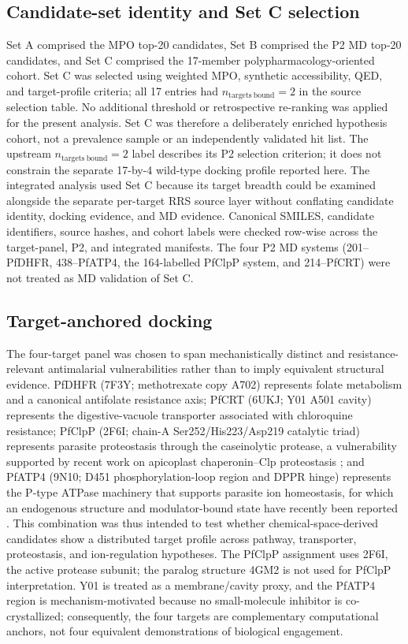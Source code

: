 \documentclass[journal=jcisd8,manuscript=article]{achemso}
\begin{document}
\subsection{Candidate-set identity and Set C selection}
Set A comprised the MPO top-20 candidates, Set B comprised the P2 MD top-20 candidates, and Set C comprised the 17-member polypharmacology-oriented cohort. Set C was selected using weighted MPO, synthetic accessibility, QED, and target-profile criteria; all 17 entries had $n_{\mathrm{targets\ bound}}=2$ in the source selection table. No additional threshold or retrospective re-ranking was applied for the present analysis. Set C was therefore a deliberately enriched hypothesis cohort, not a prevalence sample or an independently validated hit list. The upstream $n_{\mathrm{targets\ bound}}=2$ label describes its P2 selection criterion; it does not constrain the separate 17-by-4 wild-type docking profile reported here. The integrated analysis used Set C because its target breadth could be examined alongside the separate per-target RRS source layer without conflating candidate identity, docking evidence, and MD evidence. Canonical SMILES, candidate identifiers, source hashes, and cohort labels were checked row-wise across the target-panel, P2, and integrated manifests. The four P2 MD systems (201--PfDHFR, 438--PfATP4, the 164-labelled PfClpP system, and 214--PfCRT) were not treated as MD validation of Set C.

\subsection{Target-anchored docking}
The four-target panel was chosen to span mechanistically distinct and resistance-relevant antimalarial vulnerabilities rather than to imply equivalent structural evidence. PfDHFR (7F3Y; methotrexate copy A702) represents folate metabolism and a canonical antifolate resistance axis; PfCRT (6UKJ; Y01 A501 cavity) represents the digestive-vacuole transporter associated with chloroquine resistance; PfClpP (2F6I; chain-A Ser252/His223/Asp219 catalytic triad) represents parasite proteostasis through the caseinolytic protease, a vulnerability supported by recent work on apicoplast chaperonin--Clp proteostasis \cite{Tissawak2025}; and PfATP4 (9N10; D451 phosphorylation-loop region and DPPR hinge) represents the P-type ATPase machinery that supports parasite ion homeostasis, for which an endogenous structure and modulator-bound state have recently been reported \cite{Haile2025}. This combination was thus intended to test whether chemical-space-derived candidates show a distributed target profile across pathway, transporter, proteostasis, and ion-regulation hypotheses. The PfClpP assignment uses 2F6I, the active protease subunit; the paralog structure 4GM2 is not used for PfClpP interpretation. Y01 is treated as a membrane/cavity proxy, and the PfATP4 region is mechanism-motivated because no small-molecule inhibitor is co-crystallized; consequently, the four targets are complementary computational anchors, not four equivalent demonstrations of biological engagement.
\end{document}
